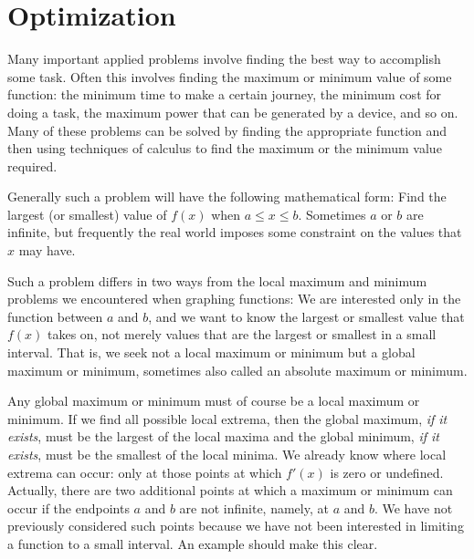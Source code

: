 \section{Optimization}{}{}
\label{sec:optimization}

Many important applied problems involve finding the best way to
accomplish some task. Often this involves finding the maximum or
minimum value of some function: the minimum time to make a certain
journey, the minimum cost for doing a task, the maximum power that can
be generated by a device, and so on. Many of these problems can be
solved by finding the appropriate function and then using techniques
of calculus to find the maximum or the minimum value required.

Generally such a problem will have the following mathematical form:
Find the largest (or smallest) value of $f(x)$ when $a\le x\le
b$. Sometimes $a$ or $b$ are infinite, but frequently the real world
imposes some constraint on the values that $x$ may have.

Such a problem differs in two ways from the local maximum and minimum
problems we encountered when graphing functions: We are interested
only in the function between $a$ and $b$, and we want to know the
largest or smallest value that $f(x)$ takes on, not merely values that
are the largest or smallest in a small interval. That is, we seek not
a local maximum or minimum but a {\dfont global\/} maximum or minimum, sometimes also called an {\dfont
absolute\/} maximum or minimum.

Any global maximum or minimum must of course be a local maximum or
minimum. If we find all possible local extrema, then the global
maximum, {\it if it exists}, must be the largest of the local maxima
and the global minimum, {\it if it exists}, must be the smallest of
the local minima. We already know where local extrema can occur: only
at those points at which $f'(x)$ is zero or undefined. Actually, there
are two additional points at which a maximum or minimum can occur if
the endpoints $a$ and $b$ are not infinite, namely, at $a$ and $b$. We
have not previously considered such points because we have not been
interested in limiting a function to a small interval. An example
should make this clear.

